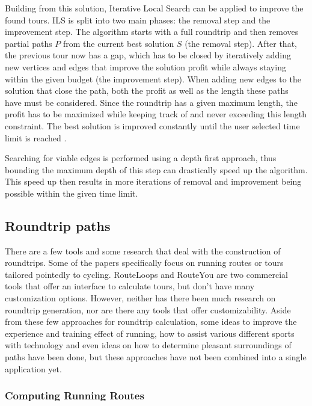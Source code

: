 Building from this solution, Iterative Local Search \cite{buchin_tour4me_2022, lu_arc_2015, verbeeck_extension_2014} can be applied to improve the found tours.
ILS is split into two main phases: the removal step and the improvement step.
The algorithm starts with a full roundtrip and then removes partial paths $P$ from the current best solution $S$ (the removal step).
After that, the previous tour now has a gap, which has to be closed by iteratively adding new vertices and edges that improve the solution profit while always staying within the given budget (the improvement step).
When adding new edges to the solution that close the path, both the profit as well as the length these paths have must be considered. 
Since the roundtrip has a given maximum length, the profit has to be maximized while keeping track of and never exceeding this length constraint.
The best solution is improved constantly until the user selected time limit is reached \cite{buchin_tour4me_2022}.

Searching for viable edges is performed using a depth first approach, thus bounding the maximum depth of this step can drastically speed up the algorithm.
This speed up then results in more iterations of removal and improvement being possible within the given time limit.



\subsection{Roundtrip paths}
\label{subsec:Roudtrip}
There are a few tools and some research that deal with the construction of roundtrips.
Some of the papers specifically focus on running routes or tours tailored pointedly to cycling.
RouteLoops and RouteYou are two commercial tools that offer an interface to calculate tours, but don't have many customization options.
However, neither has there been much research on roundtrip generation, nor are there any tools that offer customizability.
Aside from these few approaches for roundtrip calculation, some ideas to improve the experience and training effect of running, how to assist various different sports with technology and even ideas on how to determine pleasant surroundings of paths have been done, but these approaches have not been combined into a single application yet.



\subsubsection{Computing Running Routes}
\label{subsubsec:runningRoutes}

